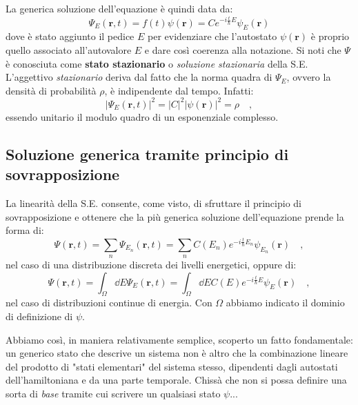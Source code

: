 La generica soluzione dell'equazione è quindi data da:
\begin{equation}
    \Psi_E(\bm{r},t) = f(t)\psi(\bm{r}) = Ce^{-i\frac{t}{\hbar}E}\psi_E(\bm{r}) 
\end{equation} 
dove è stato aggiunto il pedice $E$ per evidenziare che l'autostato $\psi(\bm{r})$ è proprio quello associato all'autovalore $E$ e dare così coerenza alla notazione. Si noti che $\Psi$ è conosciuta come \textbf{stato stazionario} o \emph{soluzione stazionaria} della S.E. 
L'aggettivo \emph{stazionario} deriva dal fatto che la norma quadra di $\Psi_E$, ovvero la densità di probabilità $\rho$, è indipendente dal tempo. Infatti:
\[
    |\Psi_E(\bm{r},t)|^2 = |C|^2|\psi(\bm{r})|^2 = \rho \quad,
\]
essendo unitario il modulo quadro di un esponenziale complesso.

\subsection{Soluzione generica tramite principio di sovrapposizione}
La linearità della S.E. consente, come visto, di sfruttare il principio di sovrapposizione e ottenere che la più generica soluzione dell'equazione prende la forma di:
\begin{equation}
    \Psi(\bm{r},t) = \sum_n \Psi_{E_n}(\bm{r},t) = \sum_n C(E_n)e^{-i\frac{t}{\hbar}E_n}\psi_{E_n}(\bm{r}) \quad,
    \label{eq:sovrapp_discr}
\end{equation}
nel caso di una distribuzione discreta dei livelli energetici, oppure di:
\begin{equation}
    \Psi(\bm{r},t) = \int_\Omega \dd{E} \Psi_{E}(\bm{r},t) = \int_\Omega \dd{E} C(E)e^{-i\frac{t}{\hbar}E}\psi_{E}(\bm{r}) \quad,
\end{equation}
nel caso di distribuzioni continue di energia. Con $\Omega$ abbiamo indicato il dominio di definizione di $\psi$.

Abbiamo così, in maniera relativamente semplice, scoperto un fatto fondamentale: un generico stato che descrive un sistema non è altro che la combinazione lineare del prodotto di "stati elementari" del sistema stesso, dipendenti dagli autostati dell'hamiltoniana e da una parte temporale. Chissà che non si possa definire una sorta di \emph{base} tramite cui scrivere un qualsiasi stato $\psi$...


